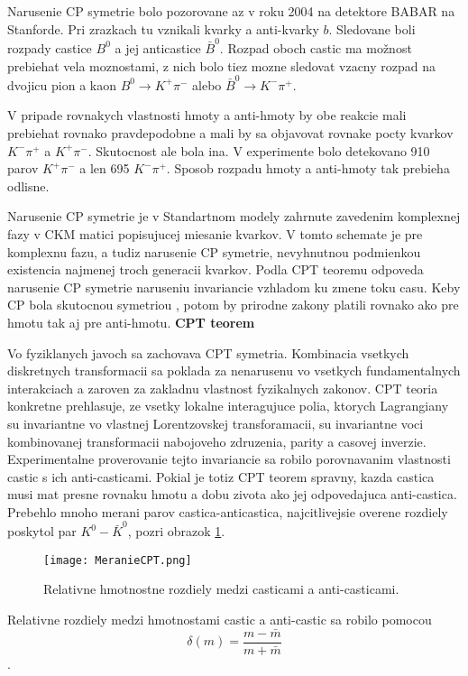 \documentclass[../../main.tex]{subfiles}
\begin{document}
Narusenie CP symetrie bolo pozorovane az v roku 2004 na detektore BABAR na Stanforde. Pri zrazkach tu vznikali kvarky a anti-kvarky $b$. Sledovane boli rozpady castice $B^0$ a jej anticastice $\bar{B}^0$. Rozpad oboch castic ma možnost prebiehat vela moznostami, z nich bolo tiez mozne sledovat vzacny rozpad na dvojicu pion a kaon $B^0 \rightarrow K^+ \pi^-$ alebo $\bar{B}^0 \rightarrow K^- \pi^+$.\par
V pripade rovnakych vlastnosti hmoty a anti-hmoty by obe reakcie mali prebiehat rovnako pravdepodobne a mali by sa objavovat rovnake pocty kvarkov $K^- \pi^+$ a $K^+ \pi^-$. Skutocnost ale bola ina. V experimente bolo detekovano 910 parov $K^+ \pi^-$ a len  695 $K^- \pi^+$. Sposob rozpadu hmoty a anti-hmoty tak prebieha odlisne.\par
Narusenie CP symetrie je v Standartnom modely zahrnute zavedenim komplexnej fazy v CKM matici popisujucej miesanie kvarkov. V tomto schemate je pre komplexnu fazu, a tudiz narusenie CP symetrie, nevyhnutnou podmienkou existencia najmenej troch generacii kvarkov. Podla CPT teoremu odpoveda narusenie CP symetrie naruseniu invariancie vzhladom ku zmene toku casu. Keby CP bola skutocnou symetriou , potom by prirodne zakony platili rovnako ako pre hmotu tak aj pre anti-hmotu.
\newline 
\textbf{CPT teorem}\par
Vo fyziklanych javoch sa zachovava CPT symetria. Kombinacia vsetkych diskretnych transformacii sa poklada za nenarusenu vo vsetkych fundamentalnych interakciach a zaroven za zakladnu vlastnost fyzikalnych zakonov. CPT teoria konkretne prehlasuje, ze vsetky lokalne interagujuce polia, ktorych Lagrangiany su invariantne vo vlastnej Lorentzovskej transforamacii, su invariantne voci kombinovanej transformacii nabojoveho zdruzenia, parity a casovej inverzie. Experimentalne proverovanie tejto invariancie sa robilo porovnavanim vlastnosti castic s ich anti-casticami. Pokial je totiz CPT teorem spravny, kazda castica musi mat presne rovnaku hmotu a dobu zivota ako jej odpovedajuca anti-castica. Prebehlo mnoho merani parov castica-anticastica, najcitlivejsie overene rozdiely poskytol par $K^0-\bar{K}^0$, pozri obrazok \ref{sf1:fig:MeranieCPT}.
\begin{figure}[!h]
\centering
\texttt{[image: MeranieCPT.png]}
\caption{Relativne hmotnostne rozdiely medzi casticami a anti-casticami.}
\label{sf1:fig:MeranieCPT}
\end{figure} \newline
Relativne rozdiely medzi hmotnostami castic a anti-castic sa robilo pomocou $$\delta(m)=\frac{m-\bar{m}}{m+\bar{m}} $$.
\end{document}
